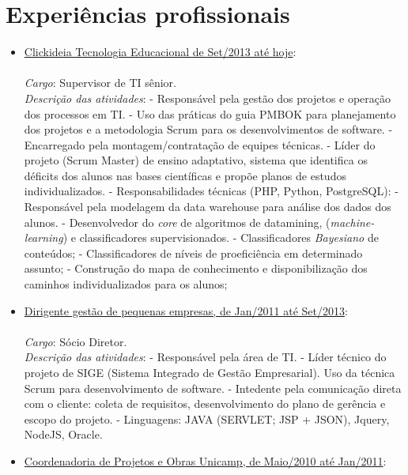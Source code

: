 \documentclass[a4paper,11pt]{article}
\begin{document}
\section{Experiências profissionais}
\begin{itemize}

\item \underline{Clickideia Tecnologia Educacional de Set/2013 até hoje}:\\
{\small \\ 
  \emph{Cargo}: Supervisor de TI sênior.\\
  \emph{Descrição das atividades}: 
  \subitem - Responsável pela gestão dos projetos e operação dos processos em TI.
  \subitem - Uso das práticas do guia PMBOK para planejamento dos projetos e a metodologia Scrum para os desenvolvimentos de software.
  \subitem - Encarregado pela montagem/contratação de equipes técnicas.
  \subitem - Líder do projeto (Scrum Master) de ensino adaptativo, sistema que identifica os déficits dos alunos nas bases científicas e propõe planos de estudos individualizados.
  \subitem - Responsabilidades técnicas (PHP, Python, PostgreSQL):
  \subsubitem - Responsável pela modelagem da data warehouse para análise dos dados dos alunos.
  \subsubitem - Desenvolvedor do \textit{core} de algoritmos de datamining, (\textit{machine-learning}) e classificadores supervisionados.
  \subsubitem - Classificadores \textit{Bayesiano} de conteúdos;
  \subsubitem - Classificadores de níveis de proeficiência em determinado assunto;
  \subsubitem - Construção do mapa de conhecimento e disponibilização dos caminhos individualizados para os alunos;
}
\item \underline{Dirigente gestão de pequenas empresas, de Jan/2011 até Set/2013}: \\
{\small \\
  \emph{Cargo}: Sócio Diretor.\\
  \emph{Descrição das atividades}: 
 \subitem - Responsável pela área de TI.
 \subitem - Líder técnico do projeto de SIGE (Sistema Integrado de Gestão Empresarial). Uso da técnica Scrum para desenvolvimento de software.
 \subitem - Intedente pela comunicação direta com o cliente: coleta de requisitos, desenvolvimento do plano de gerência e escopo do projeto.
 \subitem - Linguagens: JAVA (SERVLET; JSP + JSON), Jquery, NodeJS, Oracle.\\
}
\item \underline{Coordenadoria de Projetos e Obras Unicamp, de Maio/2010 até Jan/2011}:\\
{\small \\  
}
\end{itemize}
\end{document}
